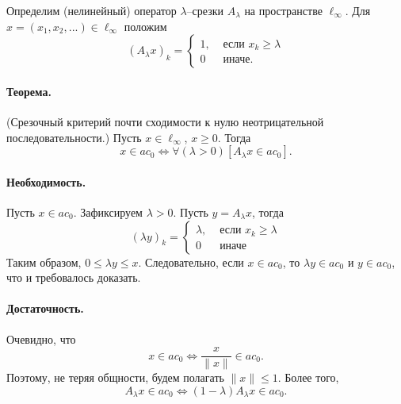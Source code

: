 \documentclass[a4paper,14pt]{article} %
\begin{document}

Определим (нелинейный) оператор $\lambda$--срезки $A_\lambda$ на пространстве $\ell_\infty$.
Для $x = (x_1, x_2, ...) \in \ell_\infty$ положим
\begin{equation}
	(A_\lambda x)_k = \begin{cases}
		1, & \mbox{~если~} x_k \geq \lambda
		\\
		0  & \mbox{~иначе.~}
	\end{cases}
\end{equation}

\paragraph{Теорема.}
(Срезочный критерий почти сходимости к нулю неотрицательной последовательности.)
Пусть $x\in\ell_\infty$, $x\geq 0$.
Тогда
\begin{equation}
	x\in ac_0 \Leftrightarrow
	\forall(\lambda>0)[A_\lambda x \in ac_0]
	.
\end{equation}

\paragraph{Необходимость.}
Пусть $x\in ac_0$.
Зафиксируем $\lambda > 0$.
Пусть $y=A_\lambda x$, тогда
\begin{equation}
	(\lambda y)_k = \begin{cases}
		\lambda, & \mbox{~если~} x_k \geq \lambda
		\\
		0  & \mbox{~иначе~}
	\end{cases}
\end{equation}
Таким образом, $0 \leq \lambda y \leq x$.
Следовательно, если $x \in ac_0$,
то $\lambda y \in ac_0$ и $y \in ac_0$,
что и требовалось доказать.

\paragraph{Достаточность.}
Очевидно, что
\begin{equation}
	x\in ac_0 \Leftrightarrow
	\frac{x}{\|x\|}\in ac_0
	.
\end{equation}
Поэтому, не теряя общности, будем полагать $\|x\|\leq 1$.
Более того,
\begin{equation}
	A_\lambda x \in ac_0 \Leftrightarrow
	(1-\lambda)A_\lambda x \in ac_0
	.
\end{equation}
\end{document}
